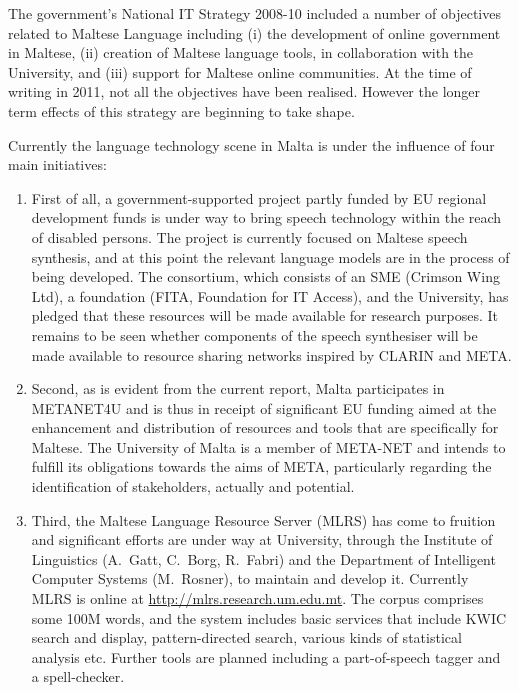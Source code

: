 \begin{multicols}{2}
The government’s National IT Strategy 2008-10 included a number of objectives related to Maltese Language including (i) the development of online government in Maltese, (ii) creation of Maltese language tools, in collaboration with the University, and (iii) support for Maltese online communities. At the time of writing in 2011, not all the objectives have been realised. However the longer term effects of this strategy are beginning to take shape. 

Currently the language technology scene in Malta is under the influence of four main initiatives:
\begin{enumerate}
\item First of all, a government-supported project partly funded by EU regional development funds is under way to bring speech technology within the reach of disabled persons. The project is currently focused on Maltese speech synthesis, and at this point the relevant language models are in the process of being developed. The consortium, which consists of an SME (Crimson Wing Ltd), a foundation (FITA, Foundation for IT Access), and the University, has pledged that these resources will be made available for research purposes. It remains to be seen whether components of the speech synthesiser will be made available to resource sharing networks inspired by CLARIN and META.

\item Second, as is evident from the current report, Malta participates in METANET4U and is thus in receipt of significant EU funding aimed at the enhancement and distribution of resources and tools that are specifically for Maltese. The University of Malta is a member of META-NET and intends to fulfill its obligations towards the aims of META, particularly regarding the identification of stakeholders, actually and potential. 

\item Third, the Maltese Language Resource Server (MLRS) has come to fruition and significant efforts are under way at University, through the Institute of Linguistics (A.~Gatt, C.~Borg, R.~Fabri) and the Department of Intelligent Computer Systems (M.~Rosner), to maintain and develop it. Currently MLRS is online at \url{http://mlrs.research.um.edu.mt}. The corpus comprises some 100M words, and the system includes basic services that include KWIC search and display, pattern-directed search, various kinds of statistical analysis etc. Further tools are planned including a part-of-speech tagger and a spell-checker.


\end{enumerate}
\end{multicols}
